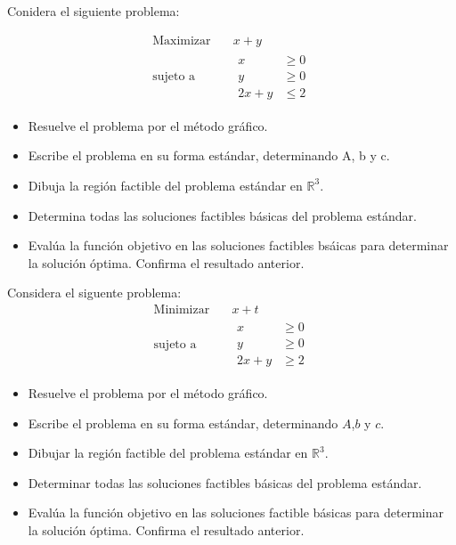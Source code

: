 \documentclass{article}
\begin{document}
Conidera el siguiente problema:

\begin{equation*}
  \begin{aligned}
    \text{Maximizar}\quad & x+y \\
    \text{sujeto a}\quad &
    \begin{aligned}
      x & \geq 0\\
      y & \geq 0\\
      2x+y & \leq 2
    \end{aligned}
  \end{aligned}
\end{equation*}

\begin{itemize}
\item Resuelve el problema por el método gráfico.
\item Escribe el problema en su forma estándar, determinando A, b y c.
\item Dibuja la región factible del problema estándar en $\mathbb{R}^3$.
\item Determina todas las soluciones factibles básicas del problema estándar.
\item Evalúa la función objetivo en las soluciones factibles bsáicas para determinar la solución óptima. Confirma el resultado anterior.
\end{itemize}
Considera el siguente problema:
\begin{equation*}
  \begin{aligned}
    \text{Minimizar}\quad & x+t \\
    \text{sujeto a}\quad &
    \begin{aligned}
      x & \geq 0 \\
      y & \geq 0\\
      2x + y & \geq 2
    \end{aligned}
  \end{aligned}  
\end{equation*}
\begin{itemize}
\item Resuelve el problema por el método gráfico.
\item Escribe el problema en su forma estándar, determinando $A$,$b$ y $c$.
\item Dibujar la región factible del problema estándar en $\mathbb{R}^3$.
\item Determinar todas las soluciones factibles básicas del problema estándar.
\item Evalúa la función objetivo en las soluciones factible básicas para determinar la solución óptima. Confirma el resultado anterior.
\end{itemize}
\end{document}
